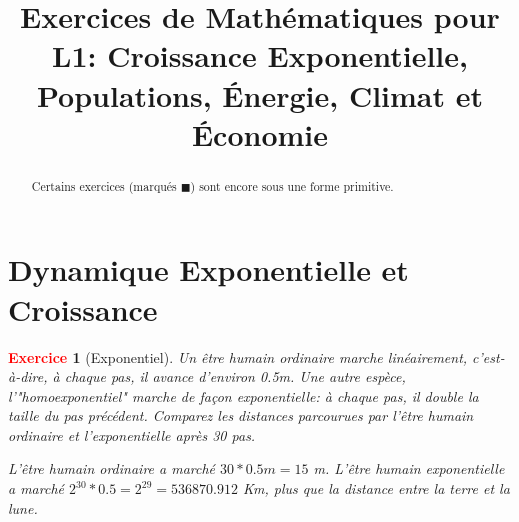 \documentclass[11pt]{article}
\theoremstyle{mythmstyle}
\newtheorem{exo}{\textcolor{red}{\textbf{Exercice}}}
\begin{document}
\title{Exercices de Mathématiques pour L1: 
Croissance Exponentielle, Populations, Énergie, Climat et Économie}

\maketitle

\begin{abstract}
Certains exercices (marqués $\blacksquare$) sont encore sous une forme primitive. 
\end{abstract}

\tableofcontents

\section{Dynamique Exponentielle et Croissance}


\begin{exo}[Exponentiel]
Un être humain ordinaire marche linéairement, c'est-à-dire, à chaque pas, il avance d'environ 0.5m. Une autre espèce, l'"homoexponentiel" marche de façon exponentielle: à chaque pas, il double la taille du pas précédent. 
Comparez les distances parcourues par l'être humain ordinaire et l'exponentielle après 30 pas.


\medskip
\begin{solution}
L'être humain ordinaire a marché $30*0.5m=15$ m. L'être humain exponentielle a marché $2^{30}*0.5=2^{29}= 536870.912$ Km, plus que la distance  entre la terre et la lune.
\end{solution}

\end{exo}

\vspace{1cm}
\end{document}
